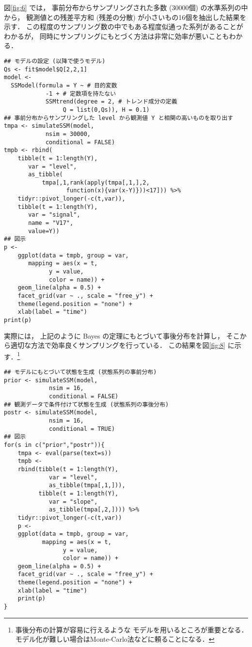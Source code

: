 \documentclass[10pt,oneside,fleqn]{scrartcl}
\begin{document}
図\ref{fig:6}
では，
事前分布からサンプリングされた多数 (30000個)
の水準系列の中から，
観測値との残差平方和 (残差の分散) が小さいもの16個を抽出した結果を示す．
この程度のサンプリング数の中でもある程度似通った系列があることがわかるが，
同時にサンプリングにもとづく方法は非常に効率が悪いこともわかる．

\begin{figure}[htbp]
  \centering
  \myGraph*{}
\end{figure}

\begin{verbatim}
## モデルの設定 (以降で使うモデル)
Qs <- fit$model$Q[2,2,1]
model <-
  SSModel(formula = Y ~ # 目的変数
		    -1 + # 定数項を持たない
		    SSMtrend(degree = 2, # トレンド成分の定義
			     Q = list(0,Qs)), H = 0.1)
## 事前分布からサンプリングした level から観測値 Y と相関の高いものを取り出す
tmpa <- simulateSSM(model,
		    nsim = 30000,
		    conditional = FALSE)
tmpb <- rbind(
    tibble(t = 1:length(Y),
	   var = "level",
	   as_tibble(
	       tmpa[,1,rank(apply(tmpa[,1,],2,
				  function(x){var(x-Y)}))<17])) %>%
    tidyr::pivot_longer(-c(t,var)),
    tibble(t = 1:length(Y),
	   var = "signal",
	   name = "V17",
	   value=Y))
## 図示
p <- 
    ggplot(data = tmpb, group = var,
	   mapping = aes(x = t,
			 y = value,
			 color = name)) +
    geom_line(alpha = 0.5) +
    facet_grid(var ~ ., scale = "free_y") +
    theme(legend.position = "none") +
    xlab(label = "time")
print(p)
\end{verbatim}

実際には，
上記のように Bayes の定理にもとづいて事後分布を計算し，
そこから適切な方法で効率良くサンプリングを行っている．
この結果を図\ref{fig:8}
に示す．\footnote{事後分布の計算が容易に行えるような
モデルを用いるところが重要となる．
モデル化が難しい場合はMonte-Carlo法などに頼ることになる．}

\begin{figure*}[htbp]
  \centering
\end{figure*}

\begin{verbatim}
## モデルにもとづいて状態を生成 (状態系列の事前分布)
prior <- simulateSSM(model,
		     nsim = 16,
		     conditional = FALSE)
## 観測データで条件付けて状態を生成 (状態系列の事後分布)
postr <- simulateSSM(model,
		     nsim = 16,
		     conditional = TRUE)
## 図示
for(s in c("prior","postr")){
    tmpa <- eval(parse(text=s))
    tmpb <- 
	rbind(tibble(t = 1:length(Y),
		     var = "level",
		     as_tibble(tmpa[,1,])),
	      tibble(t = 1:length(Y),
		     var = "slope",
		     as_tibble(tmpa[,2,]))) %>%
	tidyr::pivot_longer(-c(t,var)) 
    p <- 
	ggplot(data = tmpb, group = var,
	       mapping = aes(x = t,
			     y = value,
			     color = name)) +
	geom_line(alpha = 0.5) +
	facet_grid(var ~ ., scale = "free_y") +
	theme(legend.position = "none") +
	xlab(label = "time")
    print(p)
}
\end{verbatim}
\end{document}

